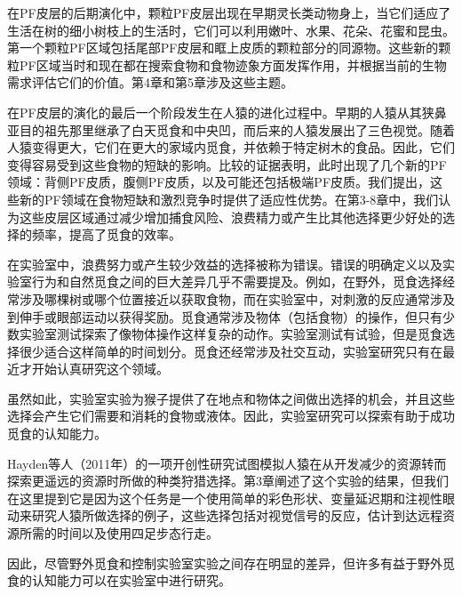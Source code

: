 在PF皮层的后期演化中，颗粒PF皮层出现在早期灵长类动物身上，当它们适应了生活在树的细小树枝上的生活时，它们可以利用嫩叶、水果、花朵、花蜜和昆虫。第一个颗粒PF区域包括尾部PF皮层和眶上皮质的颗粒部分的同源物。这些新的颗粒PF区域当时和现在都在搜索食物和食物迹象方面发挥作用，并根据当前的生物需求评估它们的价值。第4章和第5章涉及这些主题。

在PF皮层的演化的最后一个阶段发生在人猿的进化过程中。早期的人猿从其狭鼻亚目的祖先那里继承了白天觅食和中央凹，而后来的人猿发展出了三色视觉。随着人猿变得更大，它们在更大的家域内觅食，并依赖于特定树木的食品。因此，它们变得容易受到这些食物的短缺的影响。比较的证据表明，此时出现了几个新的PF领域：背侧PF皮质，腹侧PF皮质，以及可能还包括极端PF皮质。我们提出，这些新的PF领域在食物短缺和激烈竞争时提供了适应性优势。在第3-8章中，我们认为这些皮层区域通过减少增加捕食风险、浪费精力或产生比其他选择更少好处的选择的频率，提高了觅食的效率。

在实验室中，浪费努力或产生较少效益的选择被称为错误。错误的明确定义以及实验室行为和自然觅食之间的巨大差异几乎不需要提及。例如，在野外，觅食选择经常涉及哪棵树或哪个位置接近以获取食物，而在实验室中，对刺激的反应通常涉及到伸手或眼部运动以获得奖励。觅食通常涉及物体（包括食物）的操作，但只有少数实验室测试探索了像物体操作这样复杂的动作。实验室测试有试验，但是觅食选择很少适合这样简单的时间划分。觅食还经常涉及社交互动，实验室研究只有在最近才开始认真研究这个领域。

虽然如此，实验室实验为猴子提供了在地点和物体之间做出选择的机会，并且这些选择会产生它们需要和消耗的食物或液体。因此，实验室研究可以探索有助于成功觅食的认知能力。

Hayden等人（2011年）的一项开创性研究试图模拟人猿在从开发减少的资源转而探索更遥远的资源时所做的种类狩猎选择。第3章阐述了这个实验的结果，但我们在这里提到它是因为这个任务是一个使用简单的彩色形状、变量延迟期和注视性眼动来研究人猿所做选择的例子，这些选择包括对视觉信号的反应，估计到达远程资源所需的时间以及使用四足步态行走。

因此，尽管野外觅食和控制实验室实验之间存在明显的差异，但许多有益于野外觅食的认知能力可以在实验室中进行研究。

